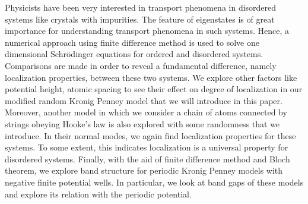 

Physicists have been very interested in transport phenomena in disordered systems like crystals with impurities. The feature of eigenstates is of great importance for understanding transport phenomena in such systems. Hence, a numerical approach using finite difference method is used to solve one dimensional Schr\"{o}dinger equations for ordered and disordered systems. Comparisons are made in order to reveal a fundamental difference, namely localization properties, between these two systems. We explore other factors like potential height, atomic spacing to see their effect on degree of localization in our modified random Kronig Penney model that we will introduce in this paper. Moreover, another model in which we consider a chain of atoms connected by strings obeying Hooke's law is also explored with some randomness that we introduce. In their normal modes, we again find localization properties for these systems. To some extent, this indicates localization is a universal property for disordered systems. Finally, with the aid of finite difference method and Bloch theorem, we explore band structure for periodic Kronig Penney models with negative finite potential wells. In particular, we look at band gaps of these models and explore its relation with the periodic potential. 